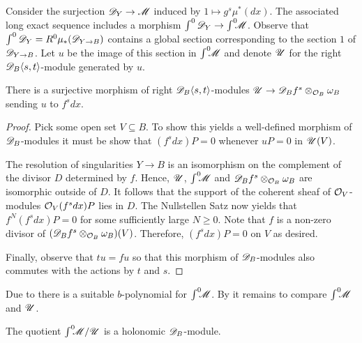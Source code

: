 Consider the surjection $\mathscr{D}_Y\to \mathscr{M}$ induced by $1 \mapsto g^s \mu^*(dx)$.
The associated long exact sequence includes a morphism $\int^0\mathscr{D}_Y \to \int^0 \mkern -8mu\mathscr{M}$.
Observe that $\int^0\mathscr{D}_Y = R^0 \mu_*(\mathscr{D}_{Y\to B})$ contains a global section corresponding to the section $1$ of $\mathscr{D}_{Y\to B}$.
Let $u$ be the image of this section in $\int^0 \mkern -8mu\mathscr{M}$ and denote $\mathscr{U}$ for the right $\mathscr{D}_B\langle s,t\rangle$-module generated by $u$.
\begin{lemma}\label{lem: SurjectiveUf}
  There is a surjective morphism of right $\mathscr{D}_B\langle s,t\rangle$-modules $\mathscr{U} \to \mathscr{D}_B f^s \otimes_{\mathcal{O}_B} \omega_B$ sending $u$ to $f^s dx$.
\end{lemma}
\begin{proof}
  Pick some open set $V\subseteq B$. To show this yields a well-defined morphism of $\mathscr{D}_B$-modules it must be show that $(f^s dx)P = 0$ whenever $uP = 0$ in $\mathscr{U}(V)$.

  The resolution of singularities $Y\to B$ is an isomorphism on the complement of the divisor $D$ determined by $f$.
  Hence, $\mathscr{U}$, $\int^0 \mkern -8mu \mathscr{M}$ and $\mathscr{D}_B f^s  \otimes_{\mathcal{O}_B}\omega_B$ are isomorphic outside of $D$.
  It follows that the support of the coherent sheaf of $\mathcal{O}_V$-modules $\mathcal{O}_V (f^s dx) P $ lies in $D$.
  The Nullstellen Satz now yields that $f^N (f^s dx) P  = 0$ for some sufficiently large $N\geq 0$.
  Note that $f$ is a non-zero divisor of $(\mathscr{D}_Bf^s\otimes_{\mathcal{O}_B} \omega_B)(V)$.
  Therefore, $(f^s dx) P= 0$ on $V$ as desired.

  Finally, observe that $tu = fu$ so that this morphism of $\mathscr{D}_B$-modules also commutes with the actions by $t$ and $s$.
\end{proof}
Due to  there is a suitable $b$-polynomial for $\int^0 \mkern -8mu \mathscr{M}$.
By  it remains to compare $\int^0 \mkern -8mu\mathscr{M}$ and $\mathscr{U}$.
\begin{lemma}\label{lem: QuotientHolonomic}
  The quotient $\int^0 \mkern -8mu\mathscr{M} / \mathscr{U}$ is a holonomic $\mathscr{D}_B$-module.
\end{lemma}
